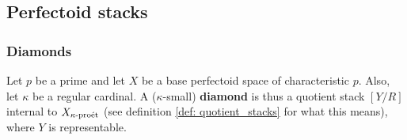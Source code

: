         \subsection{Perfectoid stacks}        
            \subsubsection{Diamonds}
                \begin{definition}[Diamonds] \label{def: diamonds} 
                    Let $p$ be a prime and let $X$ be a base perfectoid space of characteristic $p$. Also, let $\kappa$ be a regular cardinal. A ($\kappa$-small) \textbf{diamond} is thus a quotient stack $[Y/R]$ internal to $X_{\kappa\text{-}\mathrm{pro\acute{e}t}}$ (see definition \ref{def: quotient_stacks} for what this means), where $Y$ is representable.
                \end{definition}
                
